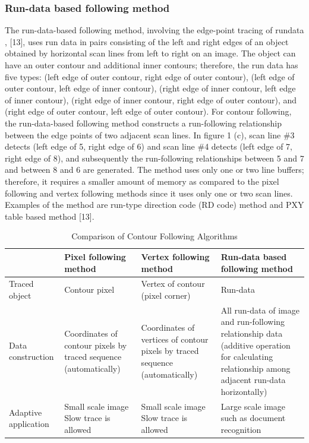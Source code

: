 \subsubsection{Run-data based following method}
The run-data-based following method, involving the edge-point tracing of rundata \cite{Miyatake1997Contour}, [13],  uses run data in pairs consisting of the left and right edges of an object obtained by horizontal scan lines from left to right on an image. The object can have an outer contour and additional inner contours; therefore, the run data has five types: (left edge of outer contour, right edge of outer contour), (left edge of outer contour, left edge of inner contour), (right edge of inner contour, left edge of inner contour), (right edge of inner contour, right edge of outer contour), and (right edge of outer contour, left edge of outer contour). For contour following, the run-data-based following method constructs a run-following relationship between the edge points of two adjacent scan lines. In figure 1 (c), scan line \#3 detects (left edge of 5, right edge of 6) and scan line \#4 detects (left edge of 7, right edge of 8), and subsequently the run-following relationships between 5 and 7 and between 8 and 6 are generated. The method uses only one or two line buffers; therefore, it requires a smaller amount of memory as compared to the pixel following and vertex following methods since it uses only one or two scan lines. Examples of the method are run-type direction code (RD code) method \cite{Miyatake1997Contour} and PXY table based method [13]. 

\begin{table}[h]
	\begin{tabular}{l|lll}
		& Pixel following method & Vertex following method & Run-data based following method \\ \hline
		Traced object 		& Contour pixel & Vertex of contour (pixel corner) & Run-data \\
		Data construction  	& Coordinates of contour pixels by traced sequence (automatically) & Coordinates of vertices of contour pixels by traced sequence (automatically) & All run-data of image and run-following relationship data (additive operation for calculating relationship among adjacent run-data horizontally) \\
		Adaptive application \cite{Miyatake1997Contour}	& Small scale image Slow trace is allowed	& Small scale image Slow trace is allowed	& Large scale image such as document recognition
	\end{tabular}
	\caption{Comparison of Contour Following Algorithms}
	\label{table:relatedworks}
\end{table}

